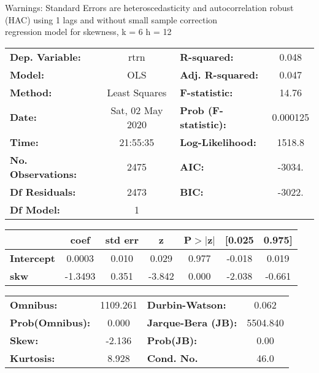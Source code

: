 Warnings: \newline
 [1] Standard Errors are heteroscedasticity and autocorrelation robust (HAC) using 1 lags and without small sample correction\\ 

regression model for skewness, k = 6 h = 12\begin{center}
\begin{tabular}{lclc}
\toprule
\textbf{Dep. Variable:}    &       rtrn       & \textbf{  R-squared:         } &     0.048   \\
\textbf{Model:}            &       OLS        & \textbf{  Adj. R-squared:    } &     0.047   \\
\textbf{Method:}           &  Least Squares   & \textbf{  F-statistic:       } &     14.76   \\
\textbf{Date:}             & Sat, 02 May 2020 & \textbf{  Prob (F-statistic):} &  0.000125   \\
\textbf{Time:}             &     21:55:35     & \textbf{  Log-Likelihood:    } &    1518.8   \\
\textbf{No. Observations:} &        2475      & \textbf{  AIC:               } &    -3034.   \\
\textbf{Df Residuals:}     &        2473      & \textbf{  BIC:               } &    -3022.   \\
\textbf{Df Model:}         &           1      & \textbf{                     } &             \\
\bottomrule
\end{tabular}
\begin{tabular}{lcccccc}
                   & \textbf{coef} & \textbf{std err} & \textbf{z} & \textbf{P$> |$z$|$} & \textbf{[0.025} & \textbf{0.975]}  \\
\midrule
\textbf{Intercept} &       0.0003  &        0.010     &     0.029  &         0.977        &       -0.018    &        0.019     \\
\textbf{skw}       &      -1.3493  &        0.351     &    -3.842  &         0.000        &       -2.038    &       -0.661     \\
\bottomrule
\end{tabular}
\begin{tabular}{lclc}
\textbf{Omnibus:}       & 1109.261 & \textbf{  Durbin-Watson:     } &    0.062  \\
\textbf{Prob(Omnibus):} &   0.000  & \textbf{  Jarque-Bera (JB):  } & 5504.840  \\
\textbf{Skew:}          &  -2.136  & \textbf{  Prob(JB):          } &     0.00  \\
\textbf{Kurtosis:}      &   8.928  & \textbf{  Cond. No.          } &     46.0  \\
\bottomrule
\end{tabular}
\end{center}

